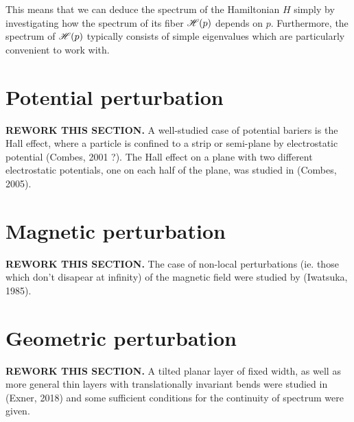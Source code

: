 This means that we can deduce the spectrum of the Hamiltonian $H$ simply by investigating how the spectrum of its fiber $\mathscr{H}(p)$ depends on $p$. Furthermore, the spectrum of $\mathscr{H}(p)$ typically consists of simple eigenvalues which are particularly convenient to work with.



\section{Potential perturbation}
\textbf{REWORK THIS SECTION.} A well-studied case of potential bariers is the Hall effect, where a particle is confined to a strip or semi-plane by electrostatic potential (Combes, 2001 ?). The Hall effect on a plane with two different electrostatic potentials, one on each half of the plane, was studied in (Combes, 2005).

\section{Magnetic perturbation}
\textbf{REWORK THIS SECTION.} The case of non-local perturbations (ie. those which don't disapear at infinity) of the magnetic field were studied by (Iwatsuka, 1985).

\section{Geometric perturbation}
\textbf{REWORK THIS SECTION.} A tilted planar layer of fixed width, as well as more general thin layers with translationally invariant bends were studied in (Exner, 2018) and some sufficient conditions for the continuity of spectrum were given.
